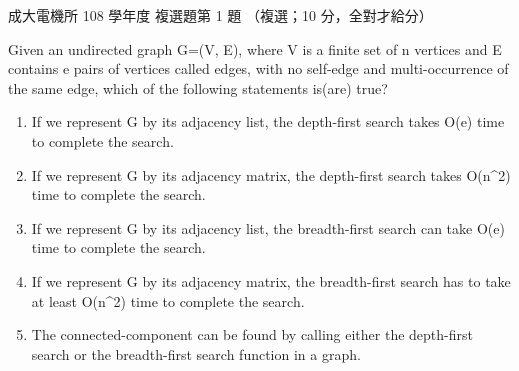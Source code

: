 \begin{pastexam}[label={px:ncku-108-ee-ds-01}]{成大電機所 108 學年度 複選題第 1 題}
（複選；10 分，全對才給分）

Given an undirected graph G=(V, E), where V is a finite set of n vertices and E contains e pairs of
vertices called edges, with no self-edge and multi-occurrence of the same edge, which of the
following statements is(are) true?
\begin{enumerate}[label=(\Alph*)]
\item If we represent G by its adjacency list, the depth-first search takes O(e) time to complete
the search.
\item If we represent G by its adjacency matrix, the depth-first search takes O(n\^{}2) time to
complete the search.
\item If we represent G by its adjacency list, the breadth-first search can take O(e) time to
complete the search.
\item If we represent G by its adjacency matrix, the breadth-first search has to take at least
O(n\^{}2) time to complete the search.
\item The connected-component can be found by calling either the depth-first search or the
breadth-first search function in a graph.
\end{enumerate}
\end{pastexam}

